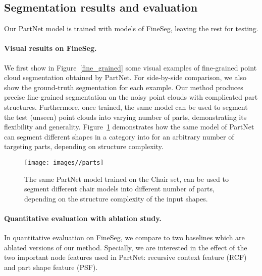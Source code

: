 \subsection{Segmentation results and evaluation}
Our PartNet model is trained with  models of FineSeg, leaving the rest  for testing.

\paragraph{Visual results on FineSeg.}
We first show in Figure~\ref{fine_grained} some visual examples of fine-grained point cloud segmentation obtained by PartNet. For side-by-side comparison, we also show the ground-truth segmentation for each example. Our method produces precise fine-grained segmentation on the noisy point clouds with complicated part structures. Furthermore, once trained, the same model can be used to segment the test (unseen) point clouds into varying number of parts, demonstrating its flexibility and generality.
Figure~\ref{fig:parts} demonstrates how the same model of PartNet can segment different shapes in a category into for an arbitrary number of targeting parts, depending on structure complexity.

\begin{figure}[t]
  \centering
  \texttt{[image: images//parts]}
  \caption{The same PartNet model trained on the Chair set, can be used to segment different chair models into different number of parts, depending on the structure complexity of the input shapes.}
  \label{fig:parts}\vspace{-10pt}
\end{figure}


\paragraph{Quantitative evaluation with ablation study.}\label{ablation study}
In quantitative evaluation on FineSeg, we compare to two baselines which are ablated versions of our method. Specially, we are interested in the effect of the two important node features used in PartNet: recursive context feature (RCF) and part shape feature (PSF).





